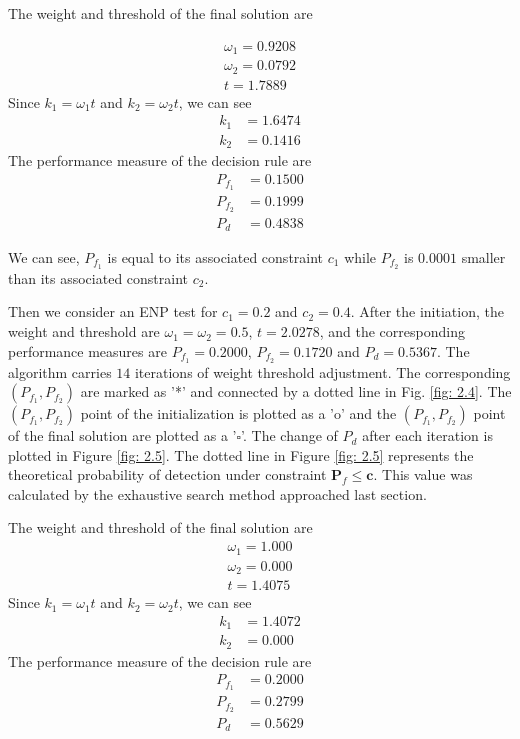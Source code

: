 \newpage

The weight and threshold of the final solution are

\[
\begin{split}
\omega_1 = 0.9208\\
\omega_2 = 0.0792\\
t = 1.7889
\end{split}
\]
Since $k_1 = \omega_1 t$ and $k_2 = \omega_2 t$, we can see
\[
\begin{split}
k_1 &= 1.6474\\
k_2 &= 0.1416
\end{split}
\]
The performance measure of the decision rule are
\[
\begin{split}
P_{f_1} &= 0.1500\\
P_{f_2} &= 0.1999\\
P_d &= 0.4838
\end{split}
\]


We can see, $P_{f_1}$ is equal to its associated constraint $c_1$  while $P_{f_2}$ is $0.0001$ smaller than its associated  constraint $c_2$. 


Then we consider an ENP test for $c_1 = 0.2$ and $c_2 = 0.4$.
After the initiation, the weight and threshold are $\omega_1 = \omega_2 = 0.5$, $t =2.0278$, and the corresponding performance measures are $P_{f_1}  = 0.2000$, $P_{f_2} = 0.1720$ and $P_d = 0.5367$. The algorithm carries $14$ iterations of weight  threshold adjustment. The corresponding $(P_{f_1}, P_{f_2})$ are   
marked as '*' and connected by a dotted line in Fig. \ref{fig: 2.4}. 
The $(P_{f_1}, P_{f_2})$ point of the initialization is plotted as  a 'o' and the $(P_{f_1}, P_{f_2})$ point of the final solution are plotted as a '$\square$'. The change of $P_d$ after each iteration is plotted in Figure \ref{fig: 2.5}. 
The dotted line in Figure \ref{fig: 2.5} represents the theoretical probability of detection under constraint $\mathbf{P}_f \leq \mathbf{c}$. This value was calculated by the exhaustive search method approached last section.  


The weight and threshold of the final solution are
\[
\begin{split}
\omega_1 = 1.000\\
\omega_2 = 0.000\\
t = 1.4075
\end{split}
\]
Since $k_1 = \omega_1t$ and $k_2 = \omega_2t$, we can see
\[
\begin{split}
k_1 &= 1.4072\\
k_2 &= 0.000
\end{split}
\]
The performance measure of the decision rule are
\[
\begin{split}
P_{f_1} &= 0.2000\\
P_{f_2} &= 0.2799\\
P_d &= 0.5629
\end{split}
\]

